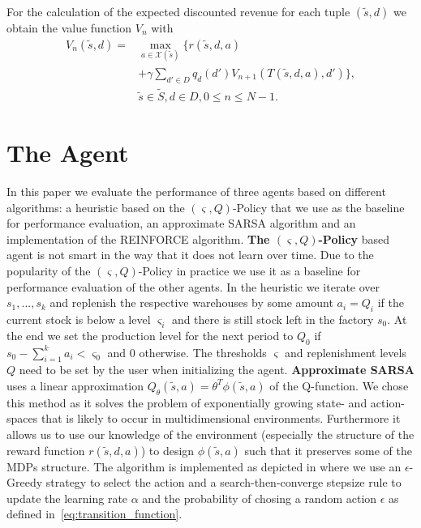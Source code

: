 \documentclass[journal, a4paper]{IEEEtran}
\theoremstyle{plain}
\theoremstyle{definition}
\begin{document}
For the calculation of the expected discounted revenue for each tuple $(\tilde{s}, d)$ we obtain the value function $V_n$ with\\
\begin{equation}
	\label{eq:ValueFunction}
	\begin{split}
		V_n(\tilde{s},d) = &\max_{a \in \mathcal{X} (\tilde{s})} \{ r(\tilde{s}, d, a)  \\
		&+ \gamma \sum_{d' \in D} q_d(d') V_{n+1}(T(\tilde{s}, d, a), d') \}, \\ 
		&\tilde{s} \in \tilde{S}, d \in D, 0 \leq n \leq N-1. 
	\end{split}
\end{equation}
\section{The Agent}
\label{sec:agent}
In this paper we evaluate the performance of three agents based on different algorithms: a heuristic based on the $(\varsigma, Q)$-Policy that we use as the baseline for performance evaluation, an approximate SARSA algorithm and an implementation of the REINFORCE algorithm. \newline
\textbf{The $(\varsigma, Q)$-Policy} based agent is not smart in the way that it does not learn over time. Due to the popularity of the $(\varsigma, Q)$-Policy in practice we use it as a baseline for performance evaluation of the other agents. In the heuristic we iterate over $s_1, ..., s_k$ and replenish the respective warehouses by some amount $a_i = Q_i$ if the current stock is below a level $\varsigma_i$ and there is still stock left in the factory $s_0$. At the end we set the production level for the next period to $Q_0$ if $s_0 - \sum_{i=1}^{k}a_i < \varsigma_0$ and $0$ otherwise. The thresholds $\varsigma$ and replenishment levels $Q$ need to be set by the user when initializing the agent.
\newline
\textbf{Approximate SARSA} uses a linear approximation $Q_{\theta}(\tilde{s}, a) = \theta^T \phi(\tilde{s},a)$ of the Q-function. We chose this method as it solves the problem of exponentially growing state- and action- spaces that is likely to occur in multidimensional environments. Furthermore it allows us to use our knowledge of the environment (especially the structure of the reward function $r(\tilde{s}, d, a)$) to design $\phi(\tilde{s}, a)$ such that it preserves some of the MDPs structure. The algorithm is implemented as depicted in \cite{LectureDRL} where we use an $\epsilon$-Greedy strategy to select the action and a search-then-converge stepsize rule to update the learning rate $\alpha$ and the probability of chosing a random action $\epsilon$ as defined in~\eqref{eq:transition_function}. \newline
\end{document}
